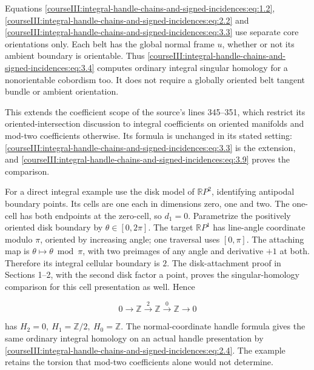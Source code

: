 Equations \eqref{courseIII:integral-handle-chains-and-signed-incidences:eq:1.2}, \eqref{courseIII:integral-handle-chains-and-signed-incidences:eq:2.2} and \eqref{courseIII:integral-handle-chains-and-signed-incidences:eq:3.3} use separate core orientations only. Each belt has the global normal frame \(u\), whether or not its ambient boundary is orientable. Thus \eqref{courseIII:integral-handle-chains-and-signed-incidences:eq:3.4} computes ordinary integral singular homology for a nonorientable cobordism too. It does not require a globally oriented belt tangent bundle or ambient orientation.

This extends the coefficient scope of the source's lines 345--351, which restrict its oriented-intersection discussion to integral coefficients on oriented manifolds and mod-two coefficients otherwise. Its formula is unchanged in its stated setting: \eqref{courseIII:integral-handle-chains-and-signed-incidences:eq:3.3} is the extension, and \eqref{courseIII:integral-handle-chains-and-signed-incidences:eq:3.9} proves the comparison.

For a direct integral example use the disk model of \(\mathbb RP^2\), identifying antipodal boundary points. Its cells are one each in dimensions zero, one and two. The one-cell has both endpoints at the zero-cell, so \(d_1=0\). Parametrize the positively oriented disk boundary by \(\theta\in[0,2\pi]\). The target \(\mathbb RP^1\) has line-angle coordinate modulo \(\pi\), oriented by increasing angle; one traversal uses \([0,\pi]\). The attaching map is \(\theta\mapsto\theta\bmod\pi\), with two preimages of any angle and derivative \(+1\) at both. Therefore its integral cellular boundary is \(2\). The disk-attachment proof in Sections 1--2, with the second disk factor a point, proves the singular-homology comparison for this cell presentation as well. Hence

\begin{equation}
0\longrightarrow\mathbb Z
 \xrightarrow{\;2\;}\mathbb Z
 \xrightarrow{\;0\;}\mathbb Z\longrightarrow0
 \label{courseIII:integral-handle-chains-and-signed-incidences:eq:3.10}
\end{equation}

has \(H_2=0,\ H_1=\mathbb Z/2,\ H_0=\mathbb Z\). The normal-coordinate handle formula gives the same ordinary integral homology on an actual handle presentation by \eqref{courseIII:integral-handle-chains-and-signed-incidences:eq:2.4}. The example retains the torsion that mod-two coefficients alone would not determine.

